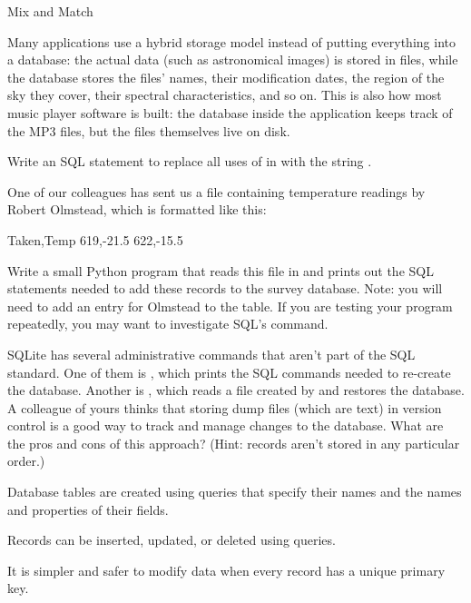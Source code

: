 \begin{swcbox}{Mix and Match}

Many applications use a hybrid storage model instead of putting
everything into a database: the actual data (such as astronomical
images) is stored in files, while the database stores the files' names,
their modification dates, the region of the sky they cover, their
spectral characteristics, and so on. This is also how most music player
software is built: the database inside the application keeps track of
the MP3 files, but the files themselves live on disk.

\end{swcbox}

\begin{challenge}
  Write an SQL statement to replace all uses of  in
   with the string .
\end{challenge}

\begin{challenge}
  One of our colleagues has sent us a  file
  containing temperature readings by Robert Olmstead, which is formatted
  like this:

\begin{VerbFile}
Taken,Temp
619,-21.5
622,-15.5
\end{VerbFile}

  Write a small Python program that reads this file in and prints out
  the SQL  statements needed to add these records to the
  survey database. Note: you will need to add an entry for Olmstead to
  the  table. If you are testing your program repeatedly,
  you may want to investigate SQL's  command.
\end{challenge}

\begin{challenge}
  SQLite has several administrative commands that aren't part of the SQL
  standard. One of them is , which prints the SQL commands
  needed to re-create the database. Another is , which
  reads a file created by  and restores the database. A
  colleague of yours thinks that storing dump files (which are text) in
  version control is a good way to track and manage changes to the
  database. What are the pros and cons of this approach? (Hint: records
  aren't stored in any particular order.)
\end{challenge}

\begin{keypoints}
\begin{swcitemize}
\item
  Database tables are created using queries that specify their names and
  the names and properties of their fields.
\item
  Records can be inserted, updated, or deleted using queries.
\item
  It is simpler and safer to modify data when every record has a unique
  primary key.
\end{swcitemize}
\end{keypoints}

